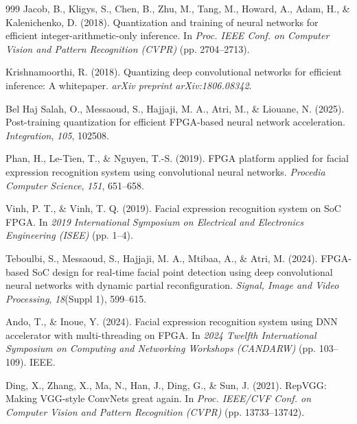 \documentclass[algorithms,article,submit,moreauthors]{Definitions/mdpi}
\begin{document}
{\begin{thebibliography}{999}
Jacob, B., Kligys, S., Chen, B., Zhu, M., Tang, M., Howard, A., Adam, H., \& Kalenichenko, D. (2018). Quantization and training of neural networks for efficient integer-arithmetic-only inference. In \textit{Proc. IEEE Conf. on Computer Vision and Pattern Recognition (CVPR)} (pp. 2704--2713).

Krishnamoorthi, R. (2018). Quantizing deep convolutional networks for efficient inference: A whitepaper. \textit{arXiv preprint arXiv:1806.08342}.

Bel Haj Salah, O., Messaoud, S., Hajjaji, M. A., Atri, M., \& Liouane, N. (2025). Post-training quantization for efficient FPGA-based neural network acceleration. \textit{Integration}, \textit{105}, 102508.

Phan, H., Le-Tien, T., \& Nguyen, T.-S. (2019). FPGA platform applied for facial expression recognition system using convolutional neural networks. \textit{Procedia Computer Science}, \textit{151}, 651--658.

Vinh, P. T., \& Vinh, T. Q. (2019). Facial expression recognition system on SoC FPGA. In \textit{2019 International Symposium on Electrical and Electronics Engineering (ISEE)} (pp. 1--4).

Teboulbi, S., Messaoud, S., Hajjaji, M. A., Mtibaa, A., \& Atri, M. (2024). FPGA-based SoC design for real-time facial point detection using deep convolutional neural networks with dynamic partial reconfiguration. \textit{Signal, Image and Video Processing}, \textit{18}(Suppl 1), 599--615.

Ando, T., \& Inoue, Y. (2024). Facial expression recognition system using DNN accelerator with multi-threading on FPGA. In \textit{2024 Twelfth International Symposium on Computing and Networking Workshops (CANDARW)} (pp. 103--109). IEEE.

Ding, X., Zhang, X., Ma, N., Han, J., Ding, G., \& Sun, J. (2021). RepVGG: Making VGG-style ConvNets great again. In \textit{Proc. IEEE/CVF Conf. on Computer Vision and Pattern Recognition (CVPR)} (pp. 13733--13742).


\end{thebibliography}}
\end{document}
